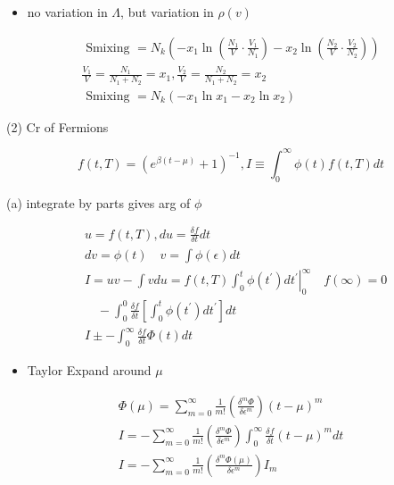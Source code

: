\documentclass[10pt]{article}
\begin{document}
\begin{itemize}
  \item no variation in $\Lambda$, but variation in $\rho(v)$
\end{itemize}

$$
\begin{array}{r}
\text { Smixing }=N_{k}\left(-x_{1} \ln \left(\frac{N_{1}}{V} \cdot \frac{V_{1}}{N_{1}}\right)-x_{2} \ln \left(\frac{N_{2}}{V} \cdot \frac{V_{2}}{N_{2}}\right)\right) \\
\frac{V_{1}}{V}=\frac{N_{1}}{N_{1}+N_{2}}=x_{1}, \frac{V_{2}}{V}=\frac{N_{2}}{N_{1}+N_{2}}=x_{2} \\
\text { Smixing }=N_{k}\left(-x_{1} \ln x_{1}-x_{2} \ln x_{2}\right)
\end{array}
$$

(2) Cr of Fermions

$$
f(t, T)=\left(e^{\beta(t-\mu)}+1\right)^{-1}, I \equiv \int_{0}^{\infty} \phi(t) f(t, T) d t
$$

(a) integrate by parts gives arg of $\phi$

$$
\begin{aligned}
& u=f(t, T), d u=\frac{\delta f}{\delta t} d t \\
& d v=\phi(t) \quad v=\int \phi(\epsilon) d t \\
& I=u v-\int v d u=\left.f(t, T) \int_{0}^{t} \phi\left(t^{\prime}\right) d t^{\prime}\right|_{0} ^{\infty} \quad f(\infty)=0 \\
& \quad-\int_{0}^{0} \frac{\delta f}{\delta t}\left[\int_{0}^{t} \phi\left(t^{\prime}\right) d t^{\prime}\right] d t \\
& I \pm-\int_{0}^{\infty} \frac{\delta f}{\delta t} \Phi(t) d t
\end{aligned}
$$

\begin{itemize}
  \item Taylor Expand around $\mu$
\end{itemize}

$$
\begin{gathered}
\Phi(\mu)=\sum_{m=0}^{\infty} \frac{1}{m !}\left(\frac{\delta^{m} \Phi}{\delta \epsilon^{m}}\right)(t-\mu)^{m} \\
I=-\sum_{m=0}^{\infty} \frac{1}{m !}\left(\frac{\delta^{m} \Phi}{\delta \epsilon^{m}}\right) \int_{0}^{\infty} \frac{\delta f}{\delta t}(t-\mu)^{m} d t \\
I=-\sum_{m=0}^{\infty} \frac{1}{m !}\left(\frac{\delta^{m} \Phi(\mu)}{\delta \epsilon^{m}}\right) I_{m}
\end{gathered}
$$
\end{document}
